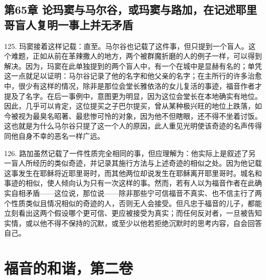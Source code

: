 
\subsection{第65章 论玛窦与马尔谷，或玛窦与路加，在记述耶里哥盲人复明一事上并无矛盾}

125. 玛窦接着这样记载：直至。马尔谷也记载了这件事，但只提到一个盲人。这个难题，正如从前在革辣撒人的地方，两个被群魔折磨的人的例子一样，可以得到解决。因为，玛窦在此单独提到的两个盲人中，有一个在城中是显赫有名的；单凭这一点就足以证明：马尔谷记录了他的名字和他父亲的名字；在主所行的许多治愈中，很少有这样的情况，除非是那位会堂长雅依洛的女儿复活的事迹，福音作者才提及了名字。在后一事例中，意图更为明显，因为这位会堂长在本地确实有地位。因此，几乎可以肯定，这位提买之子巴尔提买，曾从某种极兴旺的地位上跌落，如今被视为最臭名昭著、最悲惨可怜的对象，因为他不但瞎眼，还不得不坐着讨饭。这也就是为什么马尔谷只提了这一个人的原因，此人重见光明使该奇迹的名声传得同他自身不幸的恶名一样广远。\par

126. 路加虽然记载了一件性质完全相同的事，但应理解为：他实际上是叙述了另一盲人所经历的类似奇迹，并记录其施行方法与上述奇迹的相似之处。因为他记载这事发生在耶稣将近耶里哥时，而其他两位却说发生在耶稣离开耶里哥时。城名和事迹的相似，使人倾向认为只有一次这样的事。然而，若有人以为福音作者在此确实自相矛盾——这位说，那位说——除非那些宁可信福音不真实、也不信主行了两个性质类似且情况相似的奇迹的人，否则无人会接受。但凡忠于福音的儿子，都能立刻看出这两个假设哪个更可信、更应被接受为真实；而任何反对者，一旦被告知实情，或以他不得不保持的沉默，或至少以他若拒绝沉默时的思考内容，自会回答自己。\par



\section{福音的和谐，第二卷}

